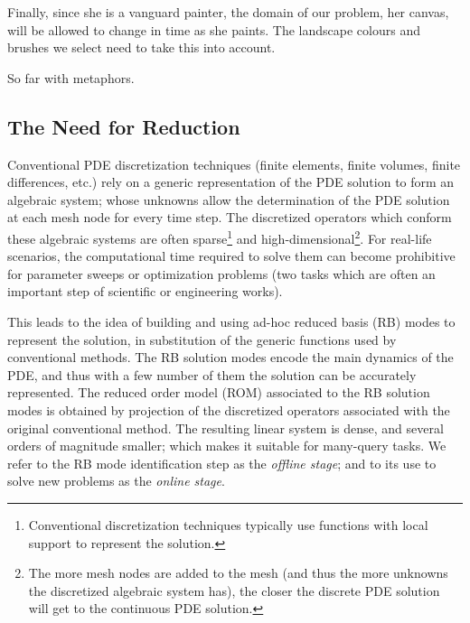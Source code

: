 \documentclass[thesis.tex]{subfiles}
\begin{document}
Finally, since she is a vanguard painter, the domain of our problem, her canvas, 
will be allowed to change in time as she paints.
The landscape colours and brushes we select need to take this into account.

So far with metaphors.

\subsection{The Need for Reduction}
Conventional PDE discretization techniques 
(finite elements, finite volumes, finite differences, etc.) 
rely on a generic representation of the PDE solution
to form an algebraic system; 
whose unknowns allow the determination of the PDE solution
at each mesh node for every time step. 
The discretized operators which conform these algebraic systems
are often sparse\footnote
{
    Conventional discretization techniques typically 
    use functions with local support to represent the solution.
}
and high-dimensional\footnote
{
    The more mesh nodes are added to the mesh
    (and thus the more unknowns the discretized algebraic system has),
    the closer the discrete PDE solution will get to the continuous PDE solution.
}.
For real-life scenarios, the computational time
required to solve them 
can become prohibitive 
for parameter sweeps or optimization problems
(two tasks which are often an important step of scientific or engineering works).

This leads to the idea of building and using
ad-hoc reduced basis (RB) modes 
to represent the solution, 
in substitution of the generic functions used by conventional methods.
The RB solution modes encode the main dynamics of the PDE,
and thus with a few number of them the solution can be accurately represented.   
The reduced order model (ROM) associated to the RB solution modes is 
obtained by projection of the discretized operators associated 
with the original conventional method.
The resulting linear system is dense,
and several orders of magnitude smaller;
which makes it suitable for many-query tasks.
We refer to the RB mode identification step as the 
\textit{offline stage};
and to its use to solve new problems as the
\textit{online stage}.
\end{document}
